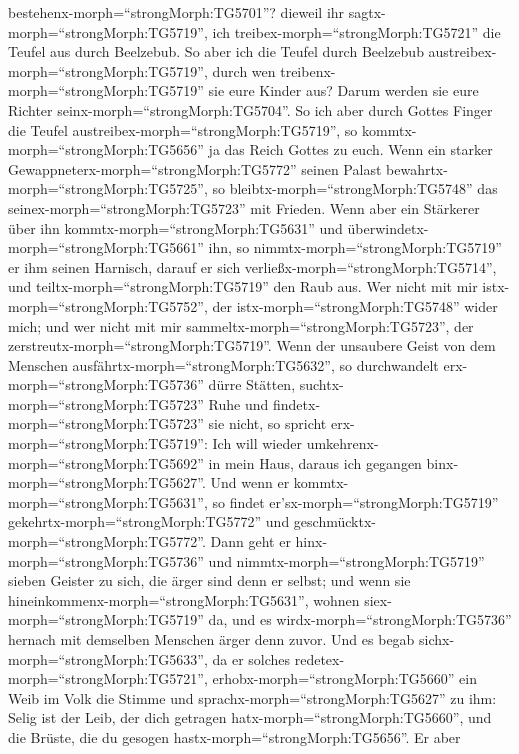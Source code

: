 bestehenx-morph=``strongMorph:TG5701''? dieweil ihr
sagtx-morph=``strongMorph:TG5719'', ich
treibex-morph=``strongMorph:TG5721'' die Teufel aus durch Beelzebub.
 So aber ich die Teufel durch Beelzebub
austreibex-morph=``strongMorph:TG5719'', durch wen
treibenx-morph=``strongMorph:TG5719'' sie eure Kinder aus? Darum werden
sie eure Richter seinx-morph=``strongMorph:TG5704''.  So
ich aber durch Gottes Finger die Teufel
austreibex-morph=``strongMorph:TG5719'', so
kommtx-morph=``strongMorph:TG5656'' ja das Reich Gottes zu euch.
 Wenn ein starker Gewappneterx-morph=``strongMorph:TG5772''
seinen Palast bewahrtx-morph=``strongMorph:TG5725'', so
bleibtx-morph=``strongMorph:TG5748'' das
seinex-morph=``strongMorph:TG5723'' mit Frieden.  Wenn aber
ein Stärkerer über ihn kommtx-morph=``strongMorph:TG5631'' und
überwindetx-morph=``strongMorph:TG5661'' ihn, so
nimmtx-morph=``strongMorph:TG5719'' er ihm seinen Harnisch, darauf er
sich verließx-morph=``strongMorph:TG5714'', und
teiltx-morph=``strongMorph:TG5719'' den Raub aus.  Wer
nicht mit mir istx-morph=``strongMorph:TG5752'', der
istx-morph=``strongMorph:TG5748'' wider mich; und wer nicht mit mir
sammeltx-morph=``strongMorph:TG5723'', der
zerstreutx-morph=``strongMorph:TG5719''.  Wenn der
unsaubere Geist von dem Menschen ausfährtx-morph=``strongMorph:TG5632'',
so durchwandelt erx-morph=``strongMorph:TG5736'' dürre Stätten,
suchtx-morph=``strongMorph:TG5723'' Ruhe und
findetx-morph=``strongMorph:TG5723'' sie nicht, so spricht
erx-morph=``strongMorph:TG5719'': Ich will wieder
umkehrenx-morph=``strongMorph:TG5692'' in mein Haus, daraus ich gegangen
binx-morph=``strongMorph:TG5627''.  Und wenn er
kommtx-morph=``strongMorph:TG5631'', so findet
er'sx-morph=``strongMorph:TG5719'' gekehrtx-morph=``strongMorph:TG5772''
und geschmücktx-morph=``strongMorph:TG5772''.  Dann geht er
hinx-morph=``strongMorph:TG5736'' und
nimmtx-morph=``strongMorph:TG5719'' sieben Geister zu sich, die ärger
sind denn er selbst; und wenn sie
hineinkommenx-morph=``strongMorph:TG5631'', wohnen
siex-morph=``strongMorph:TG5719'' da, und es
wirdx-morph=``strongMorph:TG5736'' hernach mit demselben Menschen ärger
denn zuvor.  Und es begab
sichx-morph=``strongMorph:TG5633'', da er solches
redetex-morph=``strongMorph:TG5721'',
erhobx-morph=``strongMorph:TG5660'' ein Weib im Volk die Stimme und
sprachx-morph=``strongMorph:TG5627'' zu ihm: Selig ist der Leib, der
dich getragen hatx-morph=``strongMorph:TG5660'', und die Brüste, die du
gesogen hastx-morph=``strongMorph:TG5656''.  Er aber
